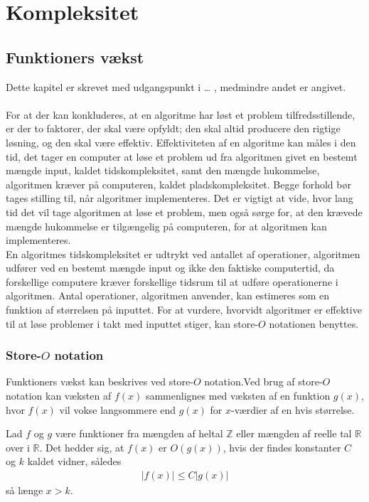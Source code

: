 \chapter{Kompleksitet}
\section{Funktioners vækst}
Dette kapitel er skrevet med udgangspunkt i … , medmindre andet er angivet. \\ \\
For at der kan konkluderes, at en algoritme har løst et problem tilfredsstillende, er der to faktorer, der skal være opfyldt; den skal altid producere den rigtige løsning, og den skal være effektiv. 
Effektiviteten af en algoritme kan måles i den tid, det tager en computer at løse et problem ud fra algoritmen givet en bestemt mængde input, kaldet tidskompleksitet, samt den mængde hukommelse, algoritmen kræver på computeren, kaldet pladskompleksitet. 
Begge forhold bør tages stilling til, når algoritmer implementeres.
Det er vigtigt at vide, hvor lang tid det vil tage algoritmen at løse et problem, men også sørge for, at den krævede mængde hukommelse er tilgængelig på computeren, for at algoritmen kan implementeres. \\ 
En algoritmes tidskompleksitet er udtrykt ved antallet af operationer, algoritmen udfører ved en bestemt mængde input og ikke den faktiske computertid, da forskellige computere kræver forskellige tidsrum til at udføre operationerne i algoritmen. 
Antal operationer, algoritmen anvender, kan estimeres som en funktion af størrelsen på inputtet. 
For at vurdere, hvorvidt algoritmer er effektive til at løse problemer i takt med inputtet stiger, kan store-$O$ notationen benyttes.

\subsection{Store-$O$ notation}
Funktioners vækst kan beskrives ved store-$O$ notation.Ved brug af store-$O$ notation kan væksten af $f(x)$ sammenlignes med væksten af en funktion $g(x)$, hvor $f(x)$ vil vokse langsommere end $g(x)$ for $x$-værdier af en hvis størrelse. \\
\begin{defn}\label{eq_o}
	Lad $f$ og $g$ være funktioner fra mængden af heltal $\mathbb{Z}$ eller mængden af reelle tal $\mathbb{R}$ over i $\mathbb{R}$. 
	Det hedder sig, at $f(x)$ er $O(g(x))$, hvis der findes konstanter $C$ og $k$ kaldet vidner, således 
\begin{align*}
|f(x)| \leq C |g(x)|
\end{align*}
så længe $x>k$.
\end{defn}

